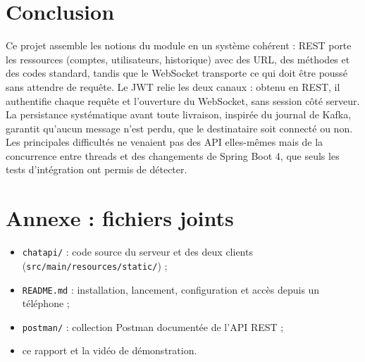 \documentclass[11pt,a4paper]{article}
\begin{document}
\section{Conclusion}

Ce projet assemble les notions du module en un système cohérent : REST porte les ressources (comptes, utilisateurs, historique) avec des URL, des méthodes et des codes standard, tandis que le WebSocket transporte ce qui doit être poussé sans attendre de requête. Le JWT relie les deux canaux : obtenu en REST, il authentifie chaque requête et l'ouverture du WebSocket, sans session côté serveur. La persistance systématique avant toute livraison, inspirée du journal de Kafka, garantit qu'aucun message n'est perdu, que le destinataire soit connecté ou non. Les principales difficultés ne venaient pas des API elles-mêmes mais de la concurrence entre threads et des changements de Spring Boot 4, que seuls les tests d'intégration ont permis de détecter.

\section*{Annexe : fichiers joints}

\begin{itemize}[topsep=0pt,itemsep=0pt]
\item \texttt{chatapi/} : code source du serveur et des deux clients (\texttt{src/main/resources/static/}) ;
\item \texttt{README.md} : installation, lancement, configuration et accès depuis un téléphone ;
\item \texttt{postman/} : collection Postman documentée de l'API REST ;
\item ce rapport et la vidéo de démonstration.
\end{itemize}
\end{document}
